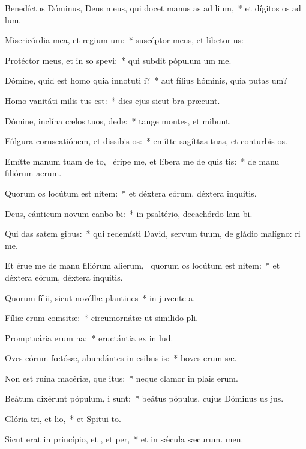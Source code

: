 \item Benedíctus Dóminus, Deus meus, qui docet manus as ad lium,~* et dígitos os ad lum.
\item Misericórdia mea, et regium um:~* suscéptor meus, et libetor us:
\item Protéctor meus, et in so spevi:~* qui subdit pópulum um  me.
\item Dómine, quid est homo quia innotuti i?~* aut fílius hóminis, quia putas um?
\item Homo vanitáti milis tus est:~* dies ejus sicut bra præeunt.
\item Dómine, inclína cælos tuos,  dede:~* tange montes, et mibunt.
\item Fúlgura coruscatiónem, et dissibis os:~* emítte sagíttas tuas, et conturbis os.
\item Emítte manum tuam de to,~\pscross{} éripe me, et líbera me de quis tis:~* de manu filiórum aerum.
\item Quorum os locútum est nitem:~* et déxtera eórum, déxtera inquitis.
\item Deus, cánticum novum canbo bi:~* in psaltério, decachórdo lam bi.
\item Qui das satem gibus:~* qui redemísti David, servum tuum, de gládio malígno: ri me.
\item Et érue me de manu filiórum alierum,~\pscross{} quorum os locútum est nitem:~* et déxtera eórum, déxtera inquitis.
\item Quorum fílii, sicut novéllæ plantines~* in juvente a.
\item Fíliæ erum comsitæ:~* circumornátæ ut similido pli.
\item Promptuária erum na:~* eructántia ex  in lud.
\item Oves eórum fœtósæ, abundántes in esibus is:~* boves erum sæ.
\item Non est ruína macériæ, que itus:~* neque clamor in plais erum.
\item Beátum dixérunt pópulum, i  sunt:~* beátus pópulus, cujus Dóminus us jus.
\item Glória tri, et lio,~* et Spitui to.
\item Sicut erat in princípio, et , et per,~* et in sǽcula sæcurum. men.
